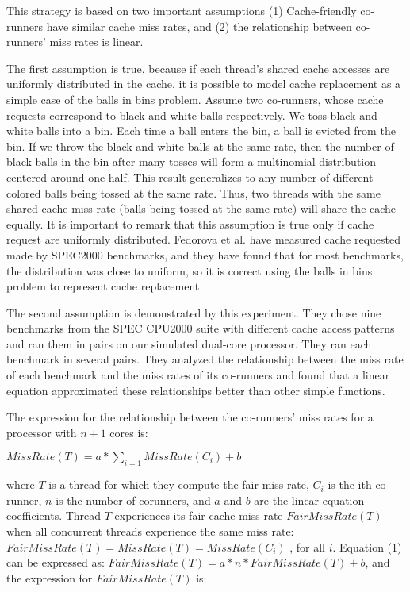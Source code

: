 \documentclass[a4paper,10pt]{article}
\begin{document}
\begin{multicols}{2}
This strategy is based on two important assumptions (1) Cache-friendly co-runners have similar cache miss rates, and 
(2) the relationship between co-runners' miss rates is linear.

The first assumption is true, because if each thread's shared cache accesses are uniformly distributed in the cache, it is possible to model cache 
replacement as a simple case of the balls in bins problem. 
Assume two co-runners, whose cache requests correspond to black and white balls respectively.
We toss black and white balls into a bin. Each time a ball enters the bin, a ball is evicted from
the bin. If we throw the black and white balls at the same rate, then the number of black balls in the bin after many tosses will form a 
multinomial distribution centered around one-half. This result generalizes to any number of different colored balls being tossed at
the same rate. Thus, two threads with the same shared cache miss rate (balls being tossed at the same rate) will share the cache equally. 
It is important to remark that this assumption is true only if cache request are uniformly distributed. Fedorova et al. have measured cache requested 
made by SPEC2000 benchmarks, and they have found that for most benchmarks, the distribution was close to uniform, so it is correct using the balls in bins
problem to represent cache replacement

The second assumption is demonstrated by this experiment.
They chose nine benchmarks from the SPEC CPU2000 suite with different cache access patterns and ran them in pairs on our simulated dual-core processor. 
They ran each benchmark in several pairs. They analyzed the relationship between the miss rate of each benchmark and the miss rates of its co-runners and 
found that a linear equation approximated these relationships better than other simple functions.

The expression for the relationship between the co-runners' miss rates for a processor with $n+1$ cores is:

	$MissRate(T) = a*\sum_{i=1} MissRate(C_{i}) + b$

where $T$ is a thread for which they compute the fair miss rate, $C_i$ is the ith co-runner, $n$ is the number of corunners, and $a$ and $b$ are the 
linear equation coefficients. Thread $T$ experiences its fair cache miss rate $FairMissRate(T)$ when all concurrent threads experience the same 
miss rate:
$FairMissRate(T) = MissRate(T) = MissRate(C_i)$ , for all $i$. Equation (1) can be expressed as: $FairMissRate(T ) = a* n* FairMissRate(T ) + b$,
and the expression for $FairMissRate(T)$ is:


\end{multicols}
\end{document}
